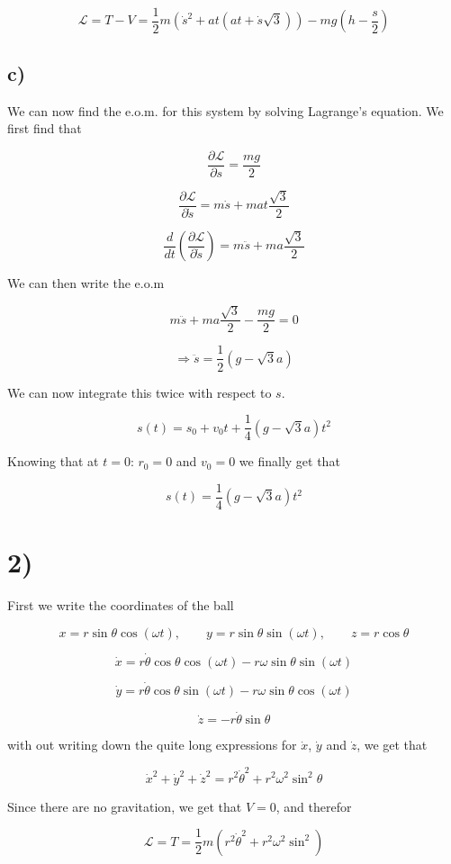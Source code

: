 \documentclass[a4paper,norsk, 10pt]{article}
\begin{document}
$$
\mathcal{L} = T -V = \frac{1}{2}m(\dot{s}^2 + at(at + \dot{s}\sqrt{3})) - mg(h-\frac{s}{2})
$$

\subsection*{c)}
We can now find the e.o.m. for this system by solving Lagrange's equation. We first find that

$$
\frac{\partial \mathcal{L}}{\partial s} = \frac{mg}{2}
$$

$$
\frac{\partial \mathcal{L}}{\partial \dot{s}} = m\dot{s} +mat\frac{\sqrt{3}}{2}
$$

$$
\frac{d}{dt}\left(\frac{\partial \mathcal{L}}{\partial \dot{s}} \right) = m\ddot{s} + ma\frac{\sqrt{3}}{2}
$$

We can then write the e.o.m

$$
m\ddot{s} + ma\frac{\sqrt{3}}{2} - \frac{mg}{2} = 0
$$

$$
\Rightarrow \ddot{s} = \frac{1}{2}(g-\sqrt{3}a)
$$

We can now integrate this twice with respect to $s$.

$$
s(t) = s_0 +v_0t + \frac{1}{4}(g-\sqrt{3}a)t^2
$$

Knowing that at $t=0$: $r_0 = 0$ and $v_0 = 0$ we finally get that

$$
s(t) = \frac{1}{4}(g-\sqrt{3}a)t^2
$$

\section*{2)}
First we write the coordinates of the ball

$$
x = r\sin\theta \cos(\omega t), \qquad y = r\sin\theta \sin(\omega t), \qquad z = r\cos \theta
$$

$$
\dot{x} = r\dot{\theta}\cos\theta \cos(\omega t) - r\omega\sin\theta \sin(\omega t) 
$$

$$
\dot{y} = r\dot{\theta}\cos\theta \sin(\omega t) - r\omega\sin\theta \cos(\omega t) 
$$

$$
\dot{z} = -r\dot{\theta}\sin \theta
$$

with out writing down the quite long expressions for $\dot{x}$, $\dot{y}$ and $\dot{z}$, we get that

$$
\dot{x}^2 + \dot{y}^2 + \dot{z}^2 = r^2\dot{\theta}^2 + r^2\omega^2\sin^2 \theta
$$

Since there are no gravitation, we get that $V = 0$, and therefor

$$
\mathcal{L} = T = \frac{1}{2}m(r^2\dot{\theta}^2 + r^2\omega^2\sin^2)
$$
\end{document}

